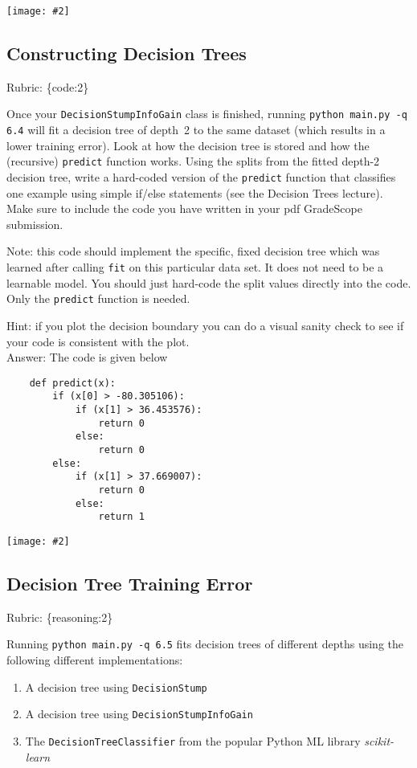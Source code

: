 \documentclass{article}
\def\rubric#1{\gre{Rubric: \{#1\}}}{}
\def\blu#1{{\color{blu}#1}}
\def\gre#1{{\color{gre}#1}}
\newcommand{\centerfig}[2]{\begin{center}\texttt{[image: \#2]}\end{center}}
\def\enum#1{\begin{enumerate}#1\end{enumerate}}
\def\ans#1{\gre{Answer: #1}}{}
\begin{document}
\centerfig{0.7}{../figs/q6_3_decisionBoundary}


\subsection{Constructing Decision Trees}
\rubric{code:2}

Once your \texttt{DecisionStumpInfoGain} class is finished, running \texttt{python main.py -q 6.4} will fit
a decision tree of depth~2 to the same dataset (which results in a lower training error).
Look at how the decision tree is stored and how the (recursive) \texttt{predict} function works.
\blu{Using the splits from the fitted depth-2 decision tree, write a hard-coded version of the \texttt{predict}
function that classifies one example using simple if/else statements
(see the Decision Trees lecture).} Make sure to include the code you have written in your pdf GradeScope submission.

Note: this code should implement the specific, fixed decision tree
which was learned after calling \texttt{fit} on this particular data set. It does not need to be a learnable model.
You should just hard-code the split values directly into the code. Only the \texttt{predict} function is needed.

Hint: if you plot the decision boundary you can do a visual sanity check to see if your code is consistent with the plot.\\
\ans{The code is given below}
\begin{Verbatim}
	def predict(x):
		if (x[0] > -80.305106):
			if (x[1] > 36.453576):
				return 0
			else:
				return 0
		else:
			if (x[1] > 37.669007):
				return 0
			else:
				return 1
\end{Verbatim}

\centerfig{0.7}{../figs/q6_4_decisionBoundary}


\subsection{Decision Tree Training Error}
\rubric{reasoning:2}

Running \texttt{python main.py -q 6.5} fits decision trees of different depths using the following different implementations: 
\enum{
\item A decision tree using \texttt{DecisionStump}
\item A decision tree using \texttt{DecisionStumpInfoGain}
\item The \texttt{DecisionTreeClassifier} from the popular Python ML library \emph{scikit-learn}
}
\end{document}
